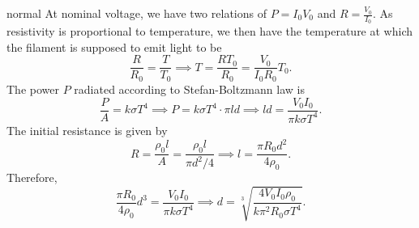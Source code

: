 \begin{solution}{normal}
At nominal voltage, we have two relations of $P=I_0 V_0$ and $R=\frac{V_0}{I_0}$. As resistivity is proportional to temperature, we then have the temperature at which the filament is supposed to emit light to be  
\[\frac{R}{R_0} = \frac{T}{T_0}\implies T = \frac{RT_0}{R_0} = \boxed{\frac{V_0}{I_0 R_0}T_0}.\]
The power $P$ radiated according to Stefan-Boltzmann law is 
\[\frac{P}{A} = k\sigma T^4\implies P = k \sigma T^4\cdot \pi ld\implies ld = \frac{V_0I_0}{\pi k \sigma T^4}.\]
The initial resistance is given by 
\[R = \frac{\rho_0 l}{A} = \frac{\rho_0 l}{\pi d^2/4}\implies l = \boxed{\frac{\pi R_0 d^2}{4\rho_0}}.\]
Therefore, 
\[\frac{\pi R_0}{4\rho_0} d^3 = \frac{V_0I_0}{\pi k \sigma T^4}\implies d = \boxed{\sqrt[3]{\frac{4V_0I_0\rho_0}{k\pi^2 R_0 \sigma T^4}}}.\]
\end{solution}